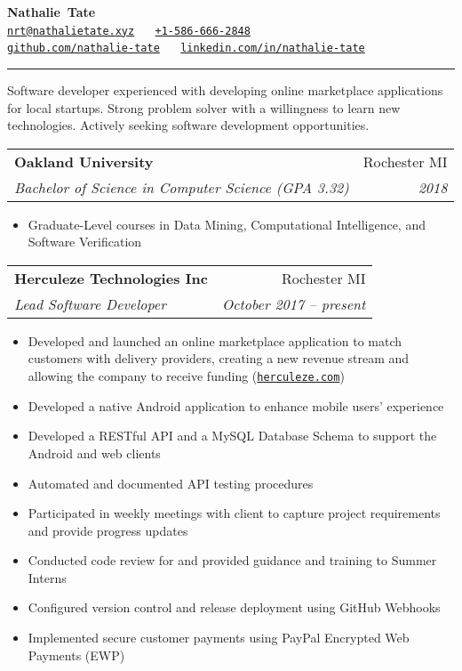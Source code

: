 \documentclass[letterpaper,10pt]{article}
\makeatletter
\newlength{\listsep}
\newcommand{\resitem}[1]{\item #1 \vspace{-2pt}}
\newcommand{\resheading}[1]{\vspace{4pt}
  \parbox{\textwidth}{
      \framebox[\textwidth][l]{
          {\textbf{\sffamily{\large #1}}}
      }
  }
}
\newcommand{\ressubheading}[4]{
\begin{tabular*}{\textwidth}{l@{\cftdotfill{\cftsecdotsep}\extracolsep{\fill}}r}
        \textbf{#1} & #2 \\
        \textit{#3} & \textit{#4} \\
\end{tabular*}\vspace{-6pt}}
\makeatother
\begin{document}
\begin{center}
  \textbf{\huge Nathalie~Tate} \\
  \vspace{5pt}
  \href{mailto:nrt@nathalietate.xyz}{\nolinkurl{nrt@nathalietate.xyz}}
  ~\textbullet~%
  \href{tel:+15866662848}{\nolinkurl{+1-586-666-2848}}
  \\%
  \href{https://github.com/nathalie-tate}{\nolinkurl{github.com/nathalie-tate}}
  ~\textbullet~%
  \href{https://linkedin.com/in/nathalie-tate}{\nolinkurl{linkedin.com/in/nathalie-tate}}
\end{center}

\begin{center}
  \rule{0.75\textwidth}{.4pt}
\end{center}

{%
  Software developer experienced with developing online marketplace applications
  for local startups. Strong problem solver with a willingness to learn new
  technologies. Actively seeking software development opportunities.
}

\resheading{Education}


\ressubheading{Oakland University}{Rochester MI}{Bachelor of Science in Computer Science {\small(GPA 3.32)}}{2018}
\begin{itemize}\itemsep \listsep \small
   \resitem{Graduate-Level courses in Data Mining, Computational Intelligence, and Software Verification}
\end{itemize}

\resheading{Professional Experience}


\ressubheading{Herculeze Technologies Inc}{Rochester MI}{Lead Software Developer}{October 2017 -- present}
\begin{itemize}\itemsep \listsep \small
	\resitem{Developed and launched an online marketplace application to match
    customers with delivery providers, creating a new revenue stream and allowing the company to receive funding
    (\href{https://herculeze.com}{\nolinkurl{herculeze.com}})}
    \resitem{Developed a native Android application to enhance mobile users'
    experience}
    \resitem{Developed a RESTful API and a MySQL Database Schema to support the
    Android and web clients}
    \resitem{Automated and documented API testing procedures}
    \resitem{Participated in weekly meetings with client to capture project
    requirements and provide progress updates}
    \resitem{Conducted code review for and provided guidance and training to Summer Interns}
    \resitem{Configured version control and release deployment using GitHub Webhooks}
    \resitem{Implemented secure customer payments using PayPal Encrypted Web Payments (EWP)}
\end{itemize}
\end{document}
